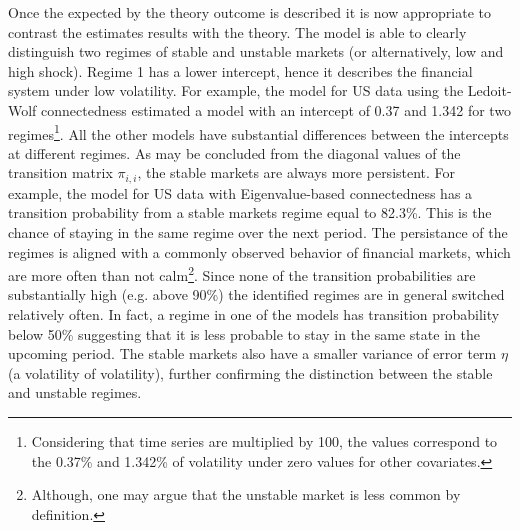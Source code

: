 \documentclass[12pt]{article}
\begin{document}
Once the expected by the theory outcome is described it is now appropriate to contrast the estimates results with the theory. The model is able to clearly distinguish two regimes of stable and unstable markets (or alternatively, low and high shock). Regime 1 has a lower intercept, hence it describes the financial system under low volatility.   For example, the model for US data using the Ledoit-Wolf connectedness estimated a model with an intercept of 0.37 and 1.342 for two regimes\footnote{Considering that time series are multiplied by 100, the values correspond to the 0.37\% and 1.342\% of volatility under zero values for other covariates.}. All the other models have substantial differences between the intercepts at different regimes. As may be concluded from the diagonal values of the transition matrix $\pi_{i,i}$, the stable markets are always more persistent. For example, the model for US data with Eigenvalue-based connectedness has a transition probability from a stable markets regime equal to 82.3\%. This is the chance of staying in the same regime over the next period. The persistance of the regimes is aligned with a commonly observed behavior of financial markets, which are more often than not calm\footnote{Although, one may argue that the unstable market is less common by definition.}. Since none of the transition probabilities are substantially high (e.g. above 90\%) the identified regimes are in general switched relatively often. In fact, a regime in one of the models has transition probability below 50\% suggesting that it is less probable to stay in the same state in the upcoming period. The stable markets also have a smaller variance of error term $\eta$ (a volatility of volatility), further confirming the distinction between the stable and unstable regimes. 
\end{document}
